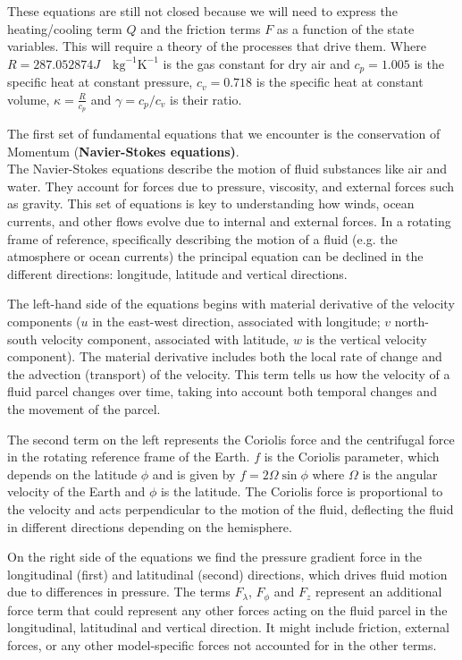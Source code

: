 These equations are still not closed because we will need to express the heating/cooling term \(Q\) and the friction terms \(F\) as a function of the state variables. This will require a theory of the processes that drive them. Where \(R=287.052874 J \quad \text{kg}^{-1} \text{K}^{-1}\) is the gas constant for dry air and \(c_p = 1.005\) is the specific heat at constant pressure, \(c_v = 0.718\) is the specific heat at constant volume, \(\kappa = \frac{R}{c_p}\) and \(\gamma=c_p/c_v\) is their ratio.


The first set of fundamental equations that we encounter is the conservation of Momentum (\textbf{Navier-Stokes equations)}.\\
The Navier-Stokes equations describe the motion of fluid substances like air and water. They account for forces due to pressure, viscosity, and external forces such as gravity. This set of equations is key to understanding how winds, ocean currents, and other flows evolve due to internal and external forces. In a rotating frame of reference, specifically describing the motion of a fluid (e.g. the atmosphere or ocean currents) the principal equation can be declined in the different directions: longitude, latitude and vertical directions. 

The left-hand side of the equations begins with material derivative of the velocity components ($u$ in the east-west direction, associated with longitude; $v$ north-south velocity component, associated with latitude, $w$ is the vertical velocity component).
The material derivative includes both the local rate of change and the advection (transport) of the velocity. This term tells us how the velocity of a fluid parcel changes over time, taking into account both temporal changes and the movement of the parcel.

The second term on the left represents the Coriolis force and the centrifugal force in the rotating reference frame of the Earth. $f$ is the Coriolis parameter, which depends on the latitude $\phi$ and is given by $f=2\Omega\sin\phi$ where $\Omega$ is the angular velocity of the Earth and $\phi$ is the latitude. The Coriolis force is proportional to the velocity and acts perpendicular to the motion of the fluid, deflecting the fluid in different directions depending on the hemisphere.

On the right side of the equations we find the pressure gradient force in the longitudinal (first) and latitudinal (second) directions, which drives fluid motion due to differences in pressure. The terms $F_{\lambda}$, $F_{\phi}$ and $F_{z}$ represent an additional force term that could represent any other forces acting on the fluid parcel in the longitudinal, latitudinal and vertical direction. It might include friction, external forces, or any other model-specific forces not accounted for in the other terms.\\

